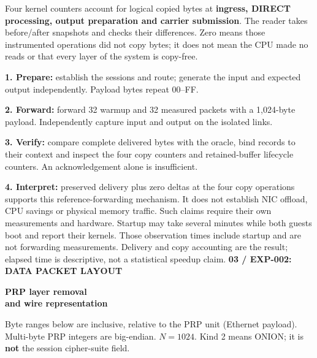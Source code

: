 \documentclass[10pt,a4paper]{article}
\newcommand{\eyebrow}[1]{{\small\bfseries\color{teal}\MakeUppercase{#1}}\par}
\newcommand{\sectionlabel}[1]{\par\vspace{4pt}{\large\bfseries #1}\par}
\begin{document}
Four kernel counters account for logical copied bytes at \textbf{ingress, DIRECT processing, output preparation and carrier submission}. The reader takes before/after snapshots and checks their differences. Zero means those instrumented operations did not copy bytes; it does not mean the CPU made no reads or that every layer of the system is copy-free.
\sectionlabel{Procedure and interpretation}
\textbf{1. Prepare:} establish the sessions and route; generate the input and expected output independently. Payload bytes repeat 00--FF.\par
\textbf{2. Forward:} forward 32 warmup and 32 measured packets with a 1,024-byte payload. Independently capture input and output on the isolated links.\par
\textbf{3. Verify:} compare complete delivered bytes with the oracle, bind records to their context and inspect the four copy counters and retained-buffer lifecycle counters. An acknowledgement alone is insufficient.\par
\textbf{4. Interpret:} preserved delivery plus zero deltas at the four copy operations supports this reference-forwarding mechanism. It does not establish NIC offload, CPU savings or physical memory traffic. Such claims require their own measurements and hardware.
\vfill
\small\color{muted}Startup may take several minutes while both guests boot and report their kernels. Those observation times include startup and are not forwarding measurements. Delivery and copy accounting are the result; elapsed time is descriptive, not a statistical speedup claim.
\newpage
\normalsize\color{ink}
\eyebrow{03 / EXP-002: data packet layout}
\vspace{4pt}
{\fontsize{23}{26}\selectfont\bfseries PRP layer removal\\and wire representation}\par
\small Byte ranges below are inclusive, relative to the PRP unit (Ethernet payload). Multi-byte PRP integers are big-endian. $N=1024$. Kind 2 means ONION; it is \textbf{not} the session cipher-suite field.\normalsize
\begin{center}
\end{center}
\end{document}
